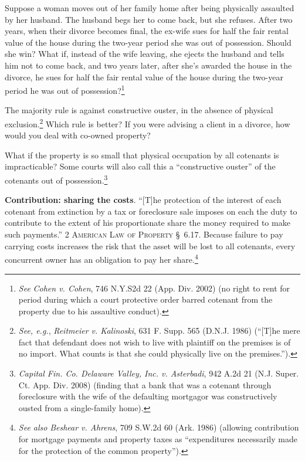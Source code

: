 Suppose a woman moves out of her family home after being physically assaulted by
her husband. The husband begs her to come back, but she refuses. After two
years, when their divorce becomes final, the ex-wife sues for half the fair
rental value of the house during the two-year period she was out of possession.
 Should she win? What if, instead of the wife leaving, she ejects the husband
and tells him not to come back, and two years later, after she's awarded the
house in the divorce, he sues for half the fair rental value of the house
during the two-year period he was out of possession?\footnote{\emph{See}
\emph{Cohen v. Cohen}, 746 N.Y.S2d 22 (App. Div. 2002) (no right to rent for
period during which a court protective order barred cotenant from the property
due to his assaultive conduct).}



The majority rule is against constructive ouster, in the absence of physical
exclusion.\footnote{\emph{See, e.g.}, \emph{Reitmeier v. Kalinoski}, 631 F.
Supp. 565 (D.N.J. 1986) (``[T]he mere fact that defendant does not wish to live
with plaintiff on the premises is of no import. What counts is that she could
physically live on the premises.'').}
Which rule is better? If you were advising a client in a divorce, how would you
deal with co-owned property?



What if the property is so small that physical occupation by all cotenants is
impracticable? Some courts will also call this a ``constructive ouster'' of
the cotenants out of possession.\footnote{\emph{Capital Fin. Co. Delaware
Valley, Inc. v. Asterbadi}, 942 A.2d 21 (N.J. Super. Ct. App. Div. 2008)
(finding that a bank that was a cotenant through foreclosure with the wife of
the defaulting mortgagor was constructively ousted from a single-family home).}



\item \textbf{Contribution: sharing the costs}. ``[T]he protection of the
interest of each cotenant from extinction by a tax or foreclosure sale imposes
on each the duty to contribute to the extent of his proportionate share the
money required to make such payments.'' 2 \textsc{American Law of Property}
\S~6.17. Because failure to pay carrying costs increases the risk that the
asset will be lost to all cotenants, every concurrent owner has an obligation
to pay her share.\footnote{\textit{See also} \emph{Beshear v. Ahrens}, 709
S.W.2d 60 (Ark. 1986) (allowing contribution for mortgage payments and property
taxes as ``expenditures necessarily made for the protection of the common
property'').}


